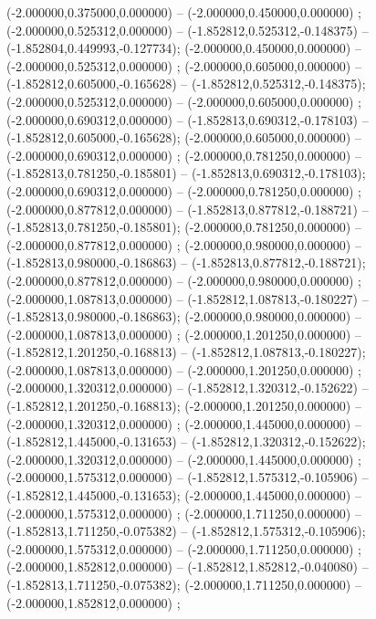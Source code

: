  (-2.000000,0.375000,0.000000) -- (-2.000000,0.450000,0.000000) ;
 (-2.000000,0.525312,0.000000) -- (-1.852812,0.525312,-0.148375) -- (-1.852804,0.449993,-0.127734);
 (-2.000000,0.450000,0.000000) -- (-2.000000,0.525312,0.000000) ;
 (-2.000000,0.605000,0.000000) -- (-1.852812,0.605000,-0.165628) -- (-1.852812,0.525312,-0.148375);
 (-2.000000,0.525312,0.000000) -- (-2.000000,0.605000,0.000000) ;
 (-2.000000,0.690312,0.000000) -- (-1.852813,0.690312,-0.178103) -- (-1.852812,0.605000,-0.165628);
 (-2.000000,0.605000,0.000000) -- (-2.000000,0.690312,0.000000) ;
 (-2.000000,0.781250,0.000000) -- (-1.852813,0.781250,-0.185801) -- (-1.852813,0.690312,-0.178103);
 (-2.000000,0.690312,0.000000) -- (-2.000000,0.781250,0.000000) ;
 (-2.000000,0.877812,0.000000) -- (-1.852813,0.877812,-0.188721) -- (-1.852813,0.781250,-0.185801);
 (-2.000000,0.781250,0.000000) -- (-2.000000,0.877812,0.000000) ;
 (-2.000000,0.980000,0.000000) -- (-1.852813,0.980000,-0.186863) -- (-1.852813,0.877812,-0.188721);
 (-2.000000,0.877812,0.000000) -- (-2.000000,0.980000,0.000000) ;
 (-2.000000,1.087813,0.000000) -- (-1.852812,1.087813,-0.180227) -- (-1.852813,0.980000,-0.186863);
 (-2.000000,0.980000,0.000000) -- (-2.000000,1.087813,0.000000) ;
 (-2.000000,1.201250,0.000000) -- (-1.852812,1.201250,-0.168813) -- (-1.852812,1.087813,-0.180227);
 (-2.000000,1.087813,0.000000) -- (-2.000000,1.201250,0.000000) ;
 (-2.000000,1.320312,0.000000) -- (-1.852812,1.320312,-0.152622) -- (-1.852812,1.201250,-0.168813);
 (-2.000000,1.201250,0.000000) -- (-2.000000,1.320312,0.000000) ;
 (-2.000000,1.445000,0.000000) -- (-1.852812,1.445000,-0.131653) -- (-1.852812,1.320312,-0.152622);
 (-2.000000,1.320312,0.000000) -- (-2.000000,1.445000,0.000000) ;
 (-2.000000,1.575312,0.000000) -- (-1.852812,1.575312,-0.105906) -- (-1.852812,1.445000,-0.131653);
 (-2.000000,1.445000,0.000000) -- (-2.000000,1.575312,0.000000) ;
 (-2.000000,1.711250,0.000000) -- (-1.852813,1.711250,-0.075382) -- (-1.852812,1.575312,-0.105906);
 (-2.000000,1.575312,0.000000) -- (-2.000000,1.711250,0.000000) ;
 (-2.000000,1.852812,0.000000) -- (-1.852812,1.852812,-0.040080) -- (-1.852813,1.711250,-0.075382);
 (-2.000000,1.711250,0.000000) -- (-2.000000,1.852812,0.000000) ;
